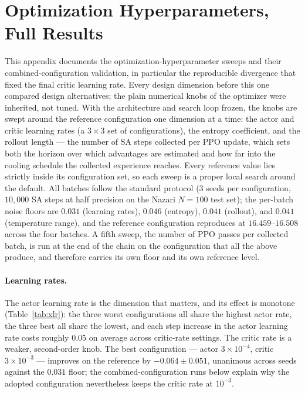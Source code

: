 \documentclass[letterpaper]{article} %
\begin{document}
\section{Optimization Hyperparameters, Full Results}
\label{app:xknobs}

This appendix documents the optimization-hyperparameter sweeps and their combined-configuration validation, in particular the reproducible divergence that fixed the final critic learning rate. Every design dimension before this one compared design alternatives; the plain numerical knobs of the optimizer were inherited, not tuned. With the architecture and search loop frozen, the knobs are swept around the reference configuration one dimension at a time: the actor and critic learning rates (a $3 \times 3$ set of configurations), the entropy coefficient, and the rollout length --- the number of SA steps collected per PPO update, which sets both the horizon over which advantages are estimated and how far into the cooling schedule the collected experience reaches. Every reference value lies strictly inside its configuration set, so each sweep is a proper local search around the default. All batches follow the standard protocol ($3$ seeds per configuration, $10{,}000$ SA steps at half precision on the Nazari $N = 100$ test set); the per-batch noise floors are $0.031$ (learning rates), $0.046$ (entropy), $0.041$ (rollout), and $0.041$ (temperature range), and the reference configuration reproduces at $16.459$--$16.508$ across the four batches. A fifth sweep, the number of PPO passes per collected batch, is run at the end of the chain on the configuration that all the above produce, and therefore carries its own floor and its own reference level.

\paragraph{Learning rates.}
The actor learning rate is the dimension that matters, and its effect is monotone (Table~\ref{tab:xlr}): the three worst configurations all share the highest actor rate, the three best all share the lowest, and each step increase in the actor learning rate costs roughly $0.05$ on average across critic-rate settings. The critic rate is a weaker, second-order knob. The best configuration --- actor $3 \times 10^{-4}$, critic $3 \times 10^{-3}$ --- improves on the reference by $-0.064 \pm 0.051$, unanimous across seeds against the $0.031$ floor; the combined-configuration runs below explain why the adopted configuration nevertheless keeps the critic rate at $10^{-3}$.
\end{document}
